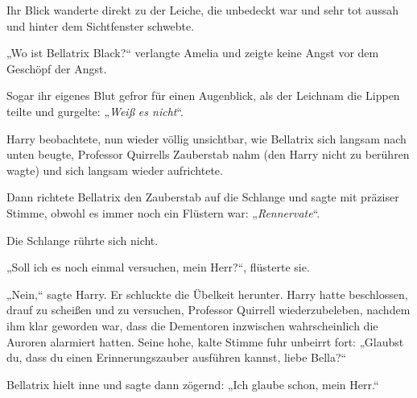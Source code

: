 Ihr Blick wanderte direkt zu der Leiche, die unbedeckt war und sehr tot aussah und hinter dem Sichtfenster schwebte.

„Wo ist Bellatrix Black?“ verlangte Amelia und zeigte keine Angst vor dem Geschöpf der Angst.

Sogar ihr eigenes Blut gefror für einen Augenblick, als der Leichnam die Lippen teilte und gurgelte: „\emph{Weiß} \emph{es nicht}“.

\later

Harry beobachtete, nun wieder völlig unsichtbar, wie Bellatrix sich langsam nach unten beugte, Professor Quirrells Zauberstab nahm (den Harry nicht zu berühren wagte) und sich langsam wieder aufrichtete.

Dann richtete Bellatrix den Zauberstab auf die Schlange und sagte mit präziser Stimme, obwohl es immer noch ein Flüstern war: „\emph{Rennervate}“.

Die Schlange rührte sich nicht.

„Soll ich es noch einmal versuchen, mein Herr?“, flüsterte sie.

„Nein,“ sagte Harry. Er schluckte die Übelkeit herunter. Harry hatte beschlossen, drauf zu scheißen und zu versuchen, Professor Quirrell wiederzubeleben, nachdem ihm klar geworden war, dass die Dementoren inzwischen wahrscheinlich die Auroren alarmiert hatten. Seine hohe, kalte Stimme fuhr unbeirrt fort: „Glaubst du, dass du einen Erinnerungszauber ausführen kannst, liebe Bella?“

Bellatrix hielt inne und sagte dann zögernd: „Ich glaube schon, mein Herr.“

